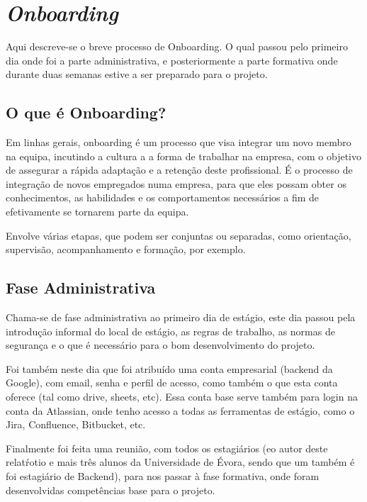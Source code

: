 \chapter{\textit{Onboarding}}\label{cap3}

Aqui descreve-se o breve processo de Onboarding. O qual passou pelo primeiro dia onde foi a parte administrativa, e posteriormente a parte formativa onde durante duas semanas estive a ser preparado para o projeto.

\section{O que é Onboarding?}

Em linhas gerais, onboarding é um processo que visa integrar um novo membro na equipa, incutindo a cultura a a forma de trabalhar na empresa, com o objetivo de assegurar a rápida adaptação e a retenção deste profissional. É o processo de integração de novos empregados numa empresa, para que eles possam obter os conhecimentos, as habilidades e os comportamentos necessários a fim de efetivamente se tornarem parte da equipa.

Envolve várias etapas, que podem ser conjuntas ou separadas, como orientação, supervisão, acompanhamento e formação, por exemplo.

\section{Fase Administrativa}

Chama-se de fase administrativa ao primeiro dia de estágio, este dia passou pela introdução informal do local de estágio, as regras de trabalho, as normas de segurança e o que é necessário para o bom desenvolvimento do projeto.

Foi também neste dia que foi atribuído uma conta empresarial (backend da Google), com email, senha e perfil de acesso, como também o que esta conta oferece (tal como drive, sheets, etc). Essa conta base serve também para login na conta da Atlassian, onde tenho acesso a todas as ferramentas de estágio, como o Jira, Confluence, Bitbucket, etc.

Finalmente foi feita uma reunião, com todos os estagiários (eo autor deste relatŕotio e mais três alunos da Universidade de Évora, sendo que um também é foi estagiário de Backend), para nos passar à fase formativa, onde foram desenvolvidas competências base para o projeto.

\newpage

